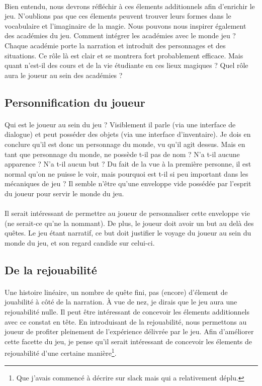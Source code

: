 \documentclass{report}
\begin{document}
\paragraph{}
Bien entendu, nous devrons réfléchir à ces élements additionnels afin d'enrichir le jeu. N'oublions pas que ces élements peuvent trouver leurs formes dans le vocabulaire et l'imaginaire de la magie. Nous pouvons nous inspirer également des académies du jeu. Comment intégrer les académies avec le monde jeu ? Chaque académie porte la narration et introduit des personnages et des situations. Ce rôle là est clair et se montrera fort probablement efficace. Mais quant n'est-il des cours et de la vie étudiante en ces lieux magiques ? Quel rôle aura le joueur au sein des académies ?

\subsection{Personnification du joueur}
\paragraph{}
Qui est le joueur au sein du jeu ? Visiblement il parle (via une interface de dialogue) et peut posséder des objets (via une interface d'inventaire). Je dois en conclure qu'il est donc un personnage du monde, vu qu'il agit dessus. Mais en tant que personnage du monde, ne possède t-il pas de nom ? N'a t-il aucune apparence ? N'a t-il aucun but ?
Du fait de la vue à la première personne, il est normal qu'on ne puisse le voir, mais pourquoi est t-il si peu important dans les mécaniques de jeu ? Il semble n'être qu'une enveloppe vide possédée par l'esprit du joueur pour servir le monde du jeu.

\paragraph{}
Il serait intéressant de permettre au joueur de personnaliser cette enveloppe vie (ne serait-ce qu'ne la nommant). De plus, le joueur doit avoir un but au delà des quêtes. Le jeu étant narratif, ce but doit justifier le voyage du joueur au sein du monde du jeu, et son regard candide sur celui-ci.



\subsection{De la rejouabilité}
\paragraph{}
Une histoire linéaire, un nombre de quête fini, pas (encore) d'élement de jouabilité à côté de la narration. À vue de nez, je dirais que le jeu aura une rejouabilité nulle.
Il peut être intéressant de concevoir les élements additionnels avec ce constat en tête. En introduisant de la rejouabilité, nous permettons au joueur de profiter pleinement de l'expérience délivrée par le jeu. Afin d'améliorer cette facette du jeu, je pense qu'il serait intéressant de concevoir les élements de rejouabilité d'une certaine manière\footnote{Que j'avais commencé à décrire sur slack mais qui a relativement déplu.}.
\end{document}
